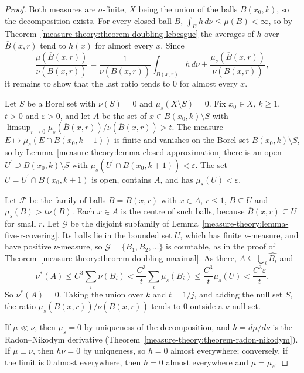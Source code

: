 \begin{proof}
Both measures are $\sigma$-finite, $X$ being the union of the balls $\overline{B}(x_0, k)$, so the decomposition exists. For every closed ball $B$, $\int_Bh\,d\nu \leq \mu(B) < \infty$, so by
Theorem~\ref{measure-theory:theorem-doubling-lebesgue} the averages of $h$ over $\overline{B}(x, r)$ tend to $h(x)$ for almost every $x$. Since
\[
\frac{\mu(\overline{B}(x, r))}{\nu(\overline{B}(x, r))} = \frac{1}{\nu(\overline{B}(x, r))}\int_{\overline{B}(x, r)}h\,d\nu + \frac{\mu_s(\overline{B}(x, r))}{\nu(\overline{B}(x, r))},
\]
it remains to show that the last ratio tends to $0$ for almost every $x$.

Let $S$ be a Borel set with $\nu(S) = 0$ and $\mu_s(X \setminus S) = 0$. Fix $x_0 \in X$, $k \geq 1$, $t > 0$ and $\varepsilon > 0$, and let $A$ be the set of $x \in B(x_0, k) \setminus S$ with
$\limsup_{r \to 0}\mu_s(\overline{B}(x, r))/\nu(\overline{B}(x, r)) > t$. The measure $E \mapsto \mu_s(E \cap B(x_0, k + 1))$ is finite and vanishes on the Borel set $B(x_0, k) \setminus S$, so by
Lemma~\ref{measure-theory:lemma-closed-approximation} there is an open $U^{\prime} \supseteq B(x_0, k) \setminus S$ with $\mu_s(U^{\prime} \cap B(x_0, k + 1)) < \varepsilon$. The set $U = U^{\prime} \cap B(x_0, k + 1)$ is
open, contains $A$, and has $\mu_s(U) < \varepsilon$.

Let $\mathcal{F}$ be the family of balls $B = \overline{B}(x, r)$ with $x \in A$, $r \leq 1$, $B \subseteq U$ and $\mu_s(B) > t\nu(B)$. Each $x \in A$ is the centre of such balls, because
$\overline{B}(x, r) \subseteq U$ for small $r$. Let $\mathcal{G}$ be the disjoint subfamily of Lemma~\ref{measure-theory:lemma-five-r-covering}. Its balls lie in the bounded set $U$, which has finite
$\nu$-measure, and have positive $\nu$-measure, so $\mathcal{G} = \{B_1, B_2, \ldots\}$ is countable, as in the proof of Theorem~\ref{measure-theory:theorem-doubling-maximal}. As there,
$A \subseteq \bigcup_i\widehat{B_i}$ and
\[
\nu^*(A) \leq C^3\sum_i\nu(B_i) < \frac{C^3}{t}\sum_i\mu_s(B_i) \leq \frac{C^3}{t}\mu_s(U) < \frac{C^3\varepsilon}{t} .
\]
So $\nu^*(A) = 0$. Taking the union over $k$ and $t = 1/j$, and adding the null set $S$, the ratio $\mu_s(\overline{B}(x, r))/\nu(\overline{B}(x, r))$ tends to $0$ outside a $\nu$-null set.

If $\mu \ll \nu$, then $\mu_s = 0$ by uniqueness of the decomposition, and $h = d\mu/d\nu$ is the Radon--Nikodym derivative (Theorem~\ref{measure-theory:theorem-radon-nikodym}). If $\mu \perp \nu$, then
$h\nu = 0$ by uniqueness, so $h = 0$ almost everywhere; conversely, if the limit is $0$ almost everywhere, then $h = 0$ almost everywhere and $\mu = \mu_s$.
\end{proof}

